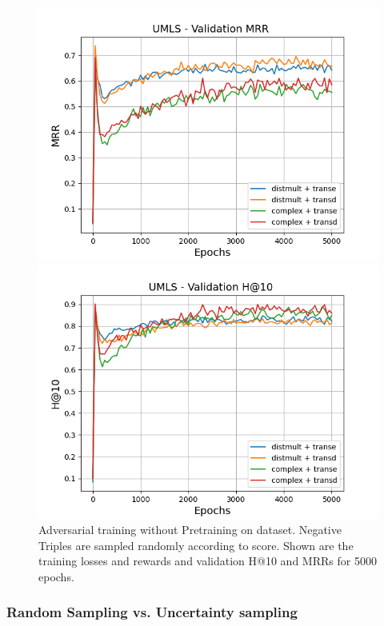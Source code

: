 \begin{figure}
\begin{minipage}{.5\textwidth}
    \end{minipage}
    \begin{minipage}{.5\textwidth}
      \centering
      \includegraphics[width=0.9\linewidth]{figures/results/gan_train/not_pretrained/random/umls/gan_train_random_umls_mrrs.png}
    \end{minipage}%
    \begin{minipage}{.5\textwidth}
      \centering
      \includegraphics[width=0.9\linewidth]{figures/results/gan_train/not_pretrained/random/umls/gan_train_random_umls_hit10s.png}
    \end{minipage}%
    \caption{Adversarial training without Pretraining on \umls dataset. 
    Negative Triples are sampled randomly according to score.
    Shown are the training losses and rewards and validation H@10 and MRRs for 5000 epochs.}
    \label{fig:advtrain_umls_not_pretrained_random}
\end{figure}



\subsubsection{Random Sampling vs. Uncertainty sampling}